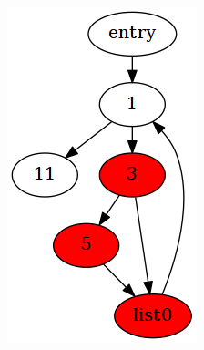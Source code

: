 \begin{figure}[htbp]
	\centering
	\begin{subfigure}[ht]{0.15\textwidth}
		\includegraphics[width=\textwidth]{inc/2_lit_review/cfg_pre_merge.png}
	\end{subfigure}
	\qquad
	\begin{subfigure}[ht]{0.15\textwidth}

\end{subfigure}
\end{figure}

